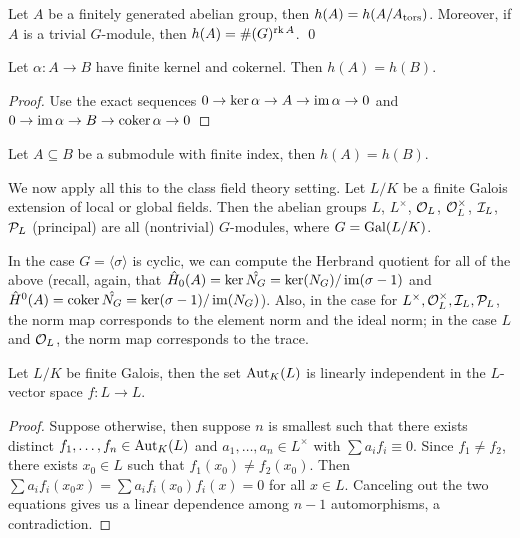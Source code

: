 \documentclass[11pt]{amsart}
\begin{document}
\begin{cor}
    Let $A$ be a finitely generated abelian group, then $h(A) = h(A/A_{\operatorname{tors}})$. Moreover, if $A$ is a trivial $G$-module, then $h(A) = \#(G)^{\operatorname{rk} A}$. \qed
\end{cor}


\begin{lem}
    Let $\alpha: A\to B$ have finite kernel and cokernel. Then $h(A) = h(B)$.
\end{lem}


\begin{proof}
    Use the exact sequences $0\to \ker\alpha \to A\to \operatorname{im}\alpha\to 0$ and $0\to \operatorname{im}\alpha \to B\to \operatorname{coker}\alpha\to 0$
\end{proof}

\begin{cor}
    Let $A\subseteq B$ be a submodule with finite index, then $h(A) = h(B)$.
\end{cor}


We now apply all this to the class field theory setting.
Let $L/K$ be a finite Galois extension of local or global fields. Then the abelian groups $L$, $L^\times$, $\mathcal{O}_L$, $\mathcal{O}_L^\times$, $\mathcal{I}_L$, $\mathcal{P}_L$ (principal) are all (nontrivial) $G$-modules, where $G = \operatorname{Gal}(L/K)$.

In the case $G = \langle \sigma\rangle$ is cyclic, we can compute the Herbrand quotient for all of the above (recall, again, that $\hat{H}_0(A) = \ker \hat{N_G} = \ker(N_G)/\operatorname{im}(\sigma-1)$ and $\hat{H}^0(A) = \operatorname{coker} \hat{N_G} = \ker(\sigma-1)/\operatorname{im}(N_G)$). Also, in the case for $L^\times, \mathcal{O}_L^\times, \mathcal{I}_L, \mathcal{P}_L$, the norm map corresponds to the element norm and the ideal norm; in the case $L$ and $\mathcal{O}_L$, the norm map corresponds to the trace.


\begin{lem}
    Let $L/K$ be finite Galois, then the set $\operatorname{Aut}_K(L)$ is linearly independent in the $L$-vector space $f:L\to L$.
\end{lem}

\begin{proof}
    Suppose otherwise, then suppose $n$ is smallest such that there exists distinct $f_1,\dots,f_n \in \operatorname{Aut}_K(L)$ and $a_1,\dots,a_n\in L^\times$ with $\sum a_if_i \equiv 0$. Since $f_1\neq f_2$, there exists $x_0\in L$ such that $f_1(x_0)\neq f_2(x_0)$. Then $\sum a_if_i(x_0x) = \sum a_if_i(x_0)f_i(x) = 0$ for all $x\in L$. Canceling out the two equations gives us a linear dependence among $n-1$ automorphisms, a contradiction. 
\end{proof}
\end{document}
